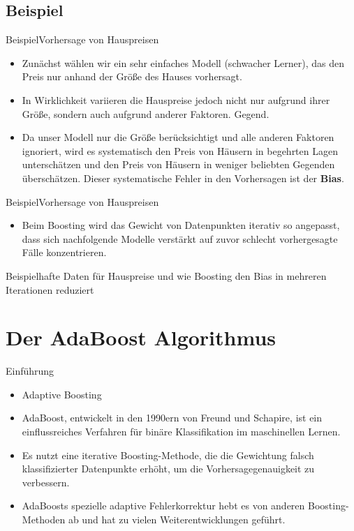 \documentclass[hyperref={bookmarks=false},11pt,dvipsnames]{beamer}
\begin{document}
\subsection*{Beispiel}
\begin{frame}[t]{Beispiel}{Vorhersage von Hauspreisen}
	\begin{itemize}
		\item <1-> Zunächst wählen wir ein sehr einfaches Modell (schwacher Lerner),
		      das den Preis nur anhand der Größe des Hauses vorhersagt.
		\item <2-> In Wirklichkeit variieren die Hauspreise jedoch nicht nur aufgrund
		      ihrer Größe, sondern auch aufgrund anderer Faktoren.
		      Gegend.
		\item <3-> Da unser Modell nur die Größe berücksichtigt und alle anderen Faktoren ignoriert,
		      wird es systematisch den Preis von Häusern in begehrten Lagen unterschätzen und den Preis
		      von Häusern in weniger beliebten Gegenden überschätzen. Dieser systematische Fehler in den
		      Vorhersagen ist der \textbf{Bias}.
	\end{itemize}
\end{frame}

\begin{frame}[t]{Beispiel}{Vorhersage von Hauspreisen}
	\begin{itemize}
		\item Beim Boosting wird das Gewicht von Datenpunkten iterativ so angepasst, dass sich
		      nachfolgende Modelle verstärkt auf zuvor schlecht vorhergesagte Fälle konzentrieren.
	\end{itemize}
	\begin{table}
		\centering
		\resizebox{\textwidth}{!}{%
			
		}
		\caption{Beispielhafte Daten für Hauspreise und wie Boosting den Bias in mehreren Iterationen reduziert}
	\end{table}
\end{frame}

\section{Der AdaBoost Algorithmus}
\begin{frame}[t]{Einführung}
	\begin{itemize}
		\item <1-> \glqq Adaptive Boosting\grqq
		\item <2-> AdaBoost, entwickelt in den 1990ern von Freund und Schapire, ist ein
		      einflussreiches Verfahren für binäre Klassifikation im maschinellen Lernen.
		\item <3-> Es nutzt eine iterative Boosting-Methode, die die Gewichtung falsch
		      klassifizierter Datenpunkte erhöht, um die Vorhersagegenauigkeit zu verbessern.
		\item <4-> AdaBoosts spezielle adaptive Fehlerkorrektur hebt es von anderen Boosting-Methoden ab und hat zu
		      vielen Weiterentwicklungen geführt.
	\end{itemize}\cite{WuKumar2009}
\end{frame}
\end{document}
